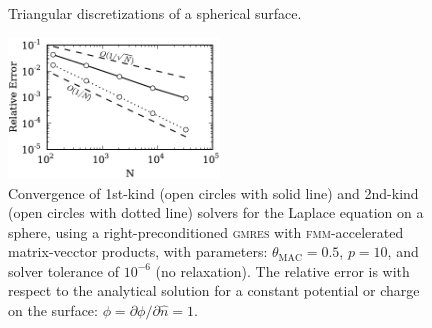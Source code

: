 \documentclass[final,leqno,]{siamltex1213}
\newcommand{\fmm}{\textsc{fmm}\xspace}
\newcommand{\gmres}{\textsc{gmres}\xspace}
\newcommand{\partialdi}[2]{\partial #1 / \partial #2}
\newcommand{\nhat}{\hat{n}}
\begin{document}
\begin{figure}[ht]
\begin{center}
	\qquad
	\caption{Triangular discretizations of a spherical surface.}
	\label{fig:glob_spheres}
\end{center}
\end{figure}
%
\begin{figure}[t]
\begin{center}
	\includegraphics[natwidth=3in,natheight=2in,width=0.5\textwidth]{LaplaceConvergence.pdf}
	\caption{Convergence of 1st-kind (open circles with solid line) and 2nd-kind (open circles with dotted line) solvers for the Laplace equation on a sphere, using a right-preconditioned \gmres with \fmm-accelerated matrix-vecctor products, with parameters: $\theta_{\text{MAC}} = 0.5$, $p=10$, and solver tolerance of $10^{-6}$ (no relaxation). The relative error is with respect to the analytical solution for a constant potential or charge on the surface: $\phi = \partialdi{\phi}{\nhat} = 1$.}
	\label{fig:laplaceconvergence}
\end{center}
\end{figure}
\end{document}
